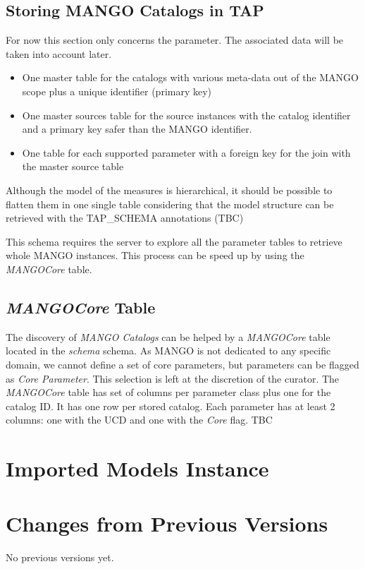 \documentclass[11pt,a4paper]{ivoa}
\begin{document}
\subsection{Storing MANGO Catalogs in TAP}
For now this section only concerns the parameter. The associated data will be taken into account later.

\begin{itemize}
  \item One master table for the catalogs with various meta-data out of the MANGO scope plus a unique identifier (primary key)
  \item One master sources table for the source instances with the catalog identifier and a primary key safer than the MANGO identifier.
  \item One table for each supported parameter with a foreign key for the join with the master source table
\end{itemize}

Although the model of the measures is hierarchical, it should be possible to flatten them in one single table considering that the model structure can be retrieved with the TAP\_SCHEMA annotations (TBC)

This schema requires the server to explore all the parameter tables to retrieve  whole MANGO instances. This process can be speed up by using the \emph{MANGOCore} table.

\subsection{ \emph{MANGOCore} Table}

The discovery of \emph{MANGO Catalogs} can be helped by a  \emph{MANGOCore} table located in the  \emph{schema} schema. As MANGO is not dedicated to any specific domain, we cannot define a set of core parameters, but parameters can be flagged as \emph{Core Parameter}. This selection is left at the discretion of the curator.
The \emph{MANGOCore} table has set of columns per parameter class plus one for the catalog ID. It has one row per stored catalog. Each parameter has at least 2 columns: one with the UCD and one with the \emph{Core} flag. TBC


\appendix

\section{Imported Models Instance}

\section{Changes from Previous Versions}

No previous versions yet.



\end{document}
